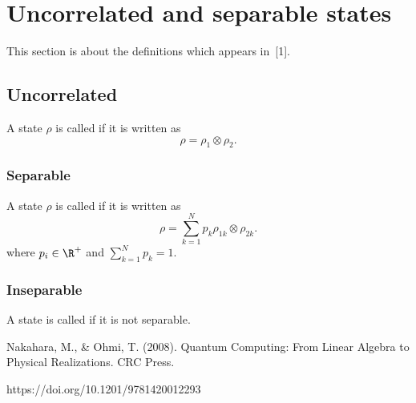 \section{Uncorrelated and separable states}
This section is about the definitions which appears in~[1].
\subsection{Uncorrelated} A state $\rho$ is called  if it is written as
\begin{equation}
    \label{eq:uncorrelated}
    \rho = \rho_1\otimes\rho_2.
\end{equation}

\subsubsection{Separable} A state $\rho$ is called  if it is written as
\begin{equation}
    \label{eq:separable}
    \rho = \sum_{k=1}^N p_k \rho_{1k}\otimes\rho_{2k}.
\end{equation}
where $p_i\in\R^+$ and $\sum_{k=1}^N p_k =1$.

\subsubsection{Inseparable} A state is called  if it is not separable.

\begin{thebibliography}{9}
    Nakahara, M., \& Ohmi, T. (2008). Quantum Computing: From Linear Algebra to Physical Realizations. CRC Press.\par https://doi.org/10.1201/9781420012293
\end{thebibliography}
